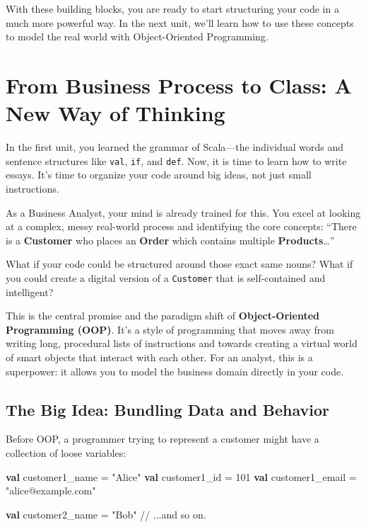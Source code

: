 \documentclass[
  letterpaper,
  DIV=11,
  numbers=noendperiod]{scrreprt}
\newenvironment{Shaded}{\begin{snugshade}}{\end{snugshade}}
\newcommand{\CommentTok}[1]{\textcolor[rgb]{0.37,0.37,0.37}{#1}}
\newcommand{\DecValTok}[1]{\textcolor[rgb]{0.68,0.00,0.00}{#1}}
\newcommand{\KeywordTok}[1]{\textcolor[rgb]{0.00,0.23,0.31}{\textbf{#1}}}
\newcommand{\NormalTok}[1]{\textcolor[rgb]{0.00,0.23,0.31}{#1}}
\newcommand{\OperatorTok}[1]{\textcolor[rgb]{0.37,0.37,0.37}{#1}}
\newcommand{\StringTok}[1]{\textcolor[rgb]{0.13,0.47,0.30}{#1}}
\begin{document}
With these building blocks, you are ready to start structuring your code
in a much more powerful way. In the next unit, we'll learn how to use
these concepts to model the real world with Object-Oriented Programming.


\chapter{From Business Process to Class: A New Way of
Thinking}\label{from-business-process-to-class-a-new-way-of-thinking}

In the first unit, you learned the grammar of Scala---the individual
words and sentence structures like \texttt{val}, \texttt{if}, and
\texttt{def}. Now, it is time to learn how to write essays. It's time to
organize your code around big ideas, not just small instructions.

As a Business Analyst, your mind is already trained for this. You excel
at looking at a complex, messy real-world process and identifying the
core concepts: ``There is a \textbf{Customer} who places an
\textbf{Order} which contains multiple \textbf{Products}\ldots{}''

What if your code could be structured around those exact same nouns?
What if you could create a digital version of a \texttt{Customer} that
is self-contained and intelligent?

This is the central promise and the paradigm shift of
\textbf{Object-Oriented Programming (OOP)}. It's a style of programming
that moves away from writing long, procedural lists of instructions and
towards creating a virtual world of smart objects that interact with
each other. For an analyst, this is a superpower: it allows you to model
the business domain directly in your code.

\section{The Big Idea: Bundling Data and
Behavior}\label{the-big-idea-bundling-data-and-behavior}

Before OOP, a programmer trying to represent a customer might have a
collection of loose variables:

\begin{Shaded}
\begin{Highlighting}[]
\KeywordTok{val}\NormalTok{ customer1\_name }\OperatorTok{=} \StringTok{"Alice"}
\KeywordTok{val}\NormalTok{ customer1\_id }\OperatorTok{=} \DecValTok{101}
\KeywordTok{val}\NormalTok{ customer1\_email }\OperatorTok{=} \StringTok{"alice@example.com"}

\KeywordTok{val}\NormalTok{ customer2\_name }\OperatorTok{=} \StringTok{"Bob"}
\CommentTok{// ...and so on.}
\end{Highlighting}
\end{Shaded}
\end{document}
